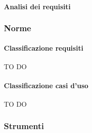 			\paragraph{Analisi dei requisiti}
			
		\subsubsection{Norme}
			\paragraph{Classificazione requisiti}
TO DO			
			\paragraph{Classificazione casi d'uso}
TO DO

		\subsubsection{Strumenti}

